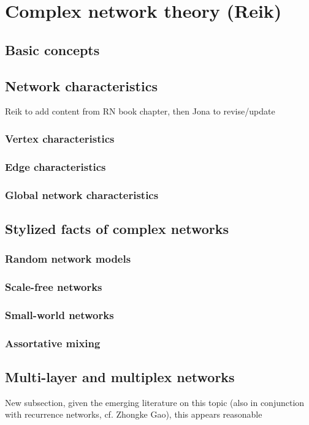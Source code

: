 \section{Complex network theory {\bf{(Reik)}}}
	\subsection{Basic concepts}

	\subsection{Network characteristics}
    Reik to add content from RN book chapter, then Jona to revise/update

		\subsubsection{Vertex characteristics}
  		\subsubsection{Edge characteristics}
		\subsubsection{Global network characteristics}

	\subsection{Stylized facts of complex networks}
		\subsubsection{Random network models}
		\subsubsection{Scale-free networks}
		\subsubsection{Small-world networks}
		\subsubsection{Assortative mixing}

	\subsection{Multi-layer and multiplex networks}
	New subsection, given the emerging literature on this topic (also in conjunction with recurrence networks, cf. Zhongke Gao), this appears reasonable

